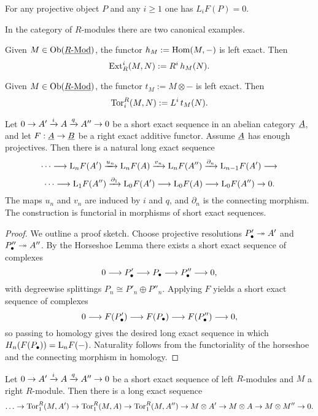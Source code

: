 \begin{remark*}
	For any projective object \( P \) and any \( i\ge 1 \) one has \( L_iF(P)=0 \).
\end{remark*}

In the category of \( R \)-modules there are two canonical examples.

\begin{examples*}
	\item Given \( M \in \operatorname{Ob}(\underline{R\text{-}\mathrm{Mod}}) \), the functor \( h_M := \operatorname{Hom}(M, -) \) is left exact. Then
		\[
			\operatorname{Ext}_R^i(M, N) := R^i \, h_M(N).
		\]
	\item Given \( M \in \operatorname{Ob}(\underline{R\text{-}\mathrm{Mod}}) \), the functor \( t_M := M \otimes - \) is left exact. Then
		\[
			\operatorname{Tor}^R_i(M, N) := L^i \, t_M(N).
		\]
\end{examples*}

\begin{theorem*}
	Let \( 0 \to A' \xrightarrow{i} A \xrightarrow{q} A'' \to 0 \) be a short exact sequence in an abelian category \( \underline{A} \), and let \( F: \underline{A} \to \underline{B} \) be a right exact additive functor. Assume \( \underline{A} \) has enough projectives. Then there is a natural long exact sequence
	\[
		\dotsm \longrightarrow \mathrm{L}_{n}F(A') \xrightarrow{u_n} \mathrm{L}_{n}F(A) \xrightarrow{v_n} \mathrm{L}_{n}F(A'') \xrightarrow{\partial_n} \mathrm{L}_{n-1}F(A') \longrightarrow
	\]
	\[
		\dotsm \longrightarrow \mathrm{L}_{1}F(A'') \xrightarrow{\partial_1} \mathrm{L}_{0}F(A') \longrightarrow \mathrm{L}_{0}F(A) \longrightarrow \mathrm{L}_{0}F(A'') \to 0.
	\]
	The maps \( u_n \) and \( v_n \) are induced by \( i \) and \( q \), and \( \partial_n \) is the connecting morphism. The construction is functorial in morphisms of short exact sequences.
\end{theorem*}

\begin{proof}
	We outline a proof sketch. Choose projective resolutions \( P'_\bullet \twoheadrightarrow A' \) and \( P''_\bullet \twoheadrightarrow A'' \). By the Horseshoe Lemma there exists a short exact sequence of complexes
	\[
		0 \longrightarrow P'_\bullet \longrightarrow P_\bullet \longrightarrow P''_\bullet \longrightarrow 0,
	\]
	with degreewise splittings \( P_n \cong P'_n \oplus P''_n \). Applying \( F \) yields a short exact sequence of complexes
	\[
		0 \longrightarrow F(P'_\bullet) \longrightarrow F(P_\bullet) \longrightarrow F(P''_\bullet) \longrightarrow 0,
	\]
	so passing to homology gives the desired long exact sequence in which \( H_n(F(P_\bullet)) = \mathrm{L}_nF(-) \). Naturality follows from the functoriality of the horseshoe and the connecting morphism in homology.
\end{proof}

\begin{example*}
	Let \( 0 \to A' \xrightarrow{i} A \xrightarrow{q} A'' \to 0 \) be a short exact sequence of left \( R \)-modules and \( M \) a right \( R \)-module. Then there is a long exact sequence
	\[
		\dotsc \to \operatorname{Tor}_1^R(M, A') \to \operatorname{Tor}_1^R(M, A) \to \operatorname{Tor}_1^R(M, A'') \to M \otimes A' \to M \otimes A \to M \otimes M'' \to 0.
	\]
\end{example*}

